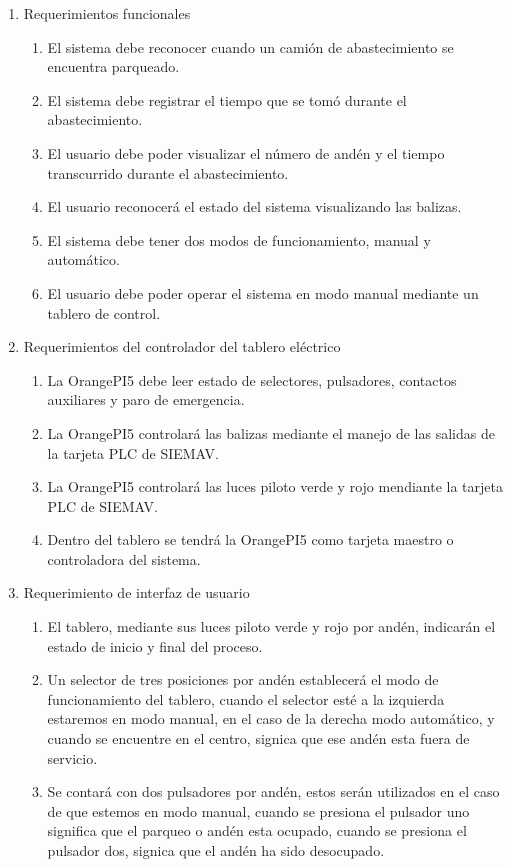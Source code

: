 \documentclass[
11pt, %
]{charter}
\begin{document}
\begin{enumerate}
	\item Requerimientos funcionales
		\begin{enumerate}
			\item El sistema debe reconocer cuando un camión de abastecimiento se encuentra parqueado.
			\item El sistema debe registrar el tiempo que se tomó durante el abastecimiento.
			\item El usuario debe poder visualizar el número de andén y el tiempo transcurrido durante el abastecimiento.
			\item El usuario reconocerá el estado del sistema visualizando las balizas.
			\item El sistema debe tener dos modos de funcionamiento, manual y automático.
			\item El usuario debe poder operar el sistema en modo manual mediante un tablero de control.
		\end{enumerate}
	\item Requerimientos del controlador del tablero eléctrico
		\begin{enumerate}
			\item La OrangePI5 debe leer estado de selectores, pulsadores, contactos auxiliares y paro de emergencia.
			\item La OrangePI5 controlará las balizas mediante el manejo de las salidas de la tarjeta PLC de SIEMAV.
			\item La OrangePI5 controlará las luces piloto verde y rojo mendiante la tarjeta PLC de SIEMAV.
			\item Dentro del tablero se tendrá la OrangePI5 como tarjeta maestro o controladora del sistema.
		\end{enumerate}
	\item Requerimiento de interfaz de usuario
		\begin{enumerate}
			\item El tablero, mediante sus luces piloto verde y rojo por andén, indicarán el estado de inicio y final del proceso.
			\item Un selector de tres posiciones por andén establecerá el modo de funcionamiento del tablero, cuando el selector esté a la izquierda estaremos en modo manual, en el caso de la derecha modo automático, y cuando se encuentre en el centro, signica que ese andén esta fuera de servicio.
			\item Se contará con dos pulsadores por andén, estos serán utilizados en el caso de que estemos en modo manual, cuando se presiona el pulsador uno significa que el parqueo o andén esta ocupado, cuando se presiona el pulsador dos, signica que el andén ha sido desocupado.

\end{enumerate}
\end{enumerate}
\end{document}
